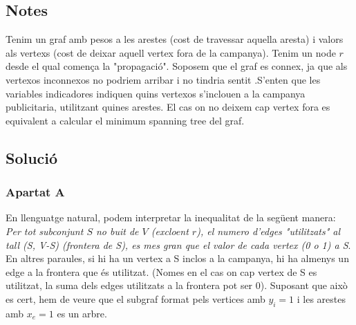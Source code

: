 \subsection{Notes}
Tenim un graf amb pesos a les arestes (cost de travessar aquella aresta) i valors als vertexs (cost de deixar aquell vertex fora de la campanya). Tenim un node $r$ desde el qual comença la "propagació". Soposem que el graf es connex, ja que als vertexos inconnexos no podriem arribar i no tindria sentit .S'enten que les variables indicadores indiquen quins vertexos s'inclouen a la campanya publicitaria, utilitzant quines arestes. El cas on no deixem cap vertex fora es equivalent a calcular el minimum spanning tree del graf. 

\subsection{Solució}
\subsubsection{Apartat A}
En llenguatge natural, podem interpretar la inequalitat de la següent manera: \textit{Per tot subconjunt $S$ no buit de $V$ (excloent $r$), el numero d'edges "utilitzats" al tall (S, V-S) (frontera de S), es mes gran que el valor de cada vertex (0 o 1) a S}. En altres paraules, si hi ha un vertex a S inclos a la campanya, hi ha almenys un edge a la frontera que és utilitzat. (Nomes en el cas on cap vertex de S es utilitzat, la suma dels edges utilitzats a la frontera pot ser 0).
Suposant que això es cert, hem de veure que el subgraf format pels vertices amb $y_i=1$ i les arestes amb $x_e=1$ es un arbre.

